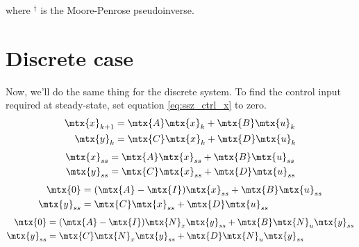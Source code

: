 where $^\dagger$ is the Moore-Penrose pseudoinverse.

\section{Discrete case}

Now, we'll do the same thing for the discrete \gls{system}. To find the
\gls{control input} required at steady-state, set equation \eqref{eq:ssz_ctrl_x}
to zero.
\begin{align*}
  \mtx{x}_{k+1} &= \mtx{A}\mtx{x}_k + \mtx{B}\mtx{u}_k \\
  \mtx{y}_k &= \mtx{C}\mtx{x}_k + \mtx{D}\mtx{u}_k
\end{align*}
\begin{align*}
  \mtx{x}_{ss} &= \mtx{A}\mtx{x}_{ss} + \mtx{B}\mtx{u}_{ss} \\
  \mtx{y}_{ss} &= \mtx{C}\mtx{x}_{ss} + \mtx{D}\mtx{u}_{ss}
\end{align*}
\begin{align*}
  \mtx{0} &= (\mtx{A} - \mtx{I})\mtx{x}_{ss} + \mtx{B}\mtx{u}_{ss} \\
  \mtx{y}_{ss} &= \mtx{C}\mtx{x}_{ss} + \mtx{D}\mtx{u}_{ss}
\end{align*}
\begin{align*}
  \mtx{0} &= (\mtx{A} - \mtx{I})\mtx{N}_x\mtx{y}_{ss} +
    \mtx{B}\mtx{N}_u\mtx{y}_{ss} \\
  \mtx{y}_{ss} &= \mtx{C}\mtx{N}_x\mtx{y}_{ss} + \mtx{D}\mtx{N}_u\mtx{y}_{ss}
\end{align*}
